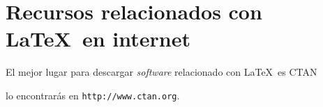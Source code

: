 \documentclass{article}
\begin{document}
\section{\textsf{Recursos relacionados con \LaTeX\ en internet}}

El mejor lugar para descargar \textit{software} relacionado con \LaTeX\ es CTAN

lo encontrarás en \texttt{http://www.ctan.org}.
\end{document}
